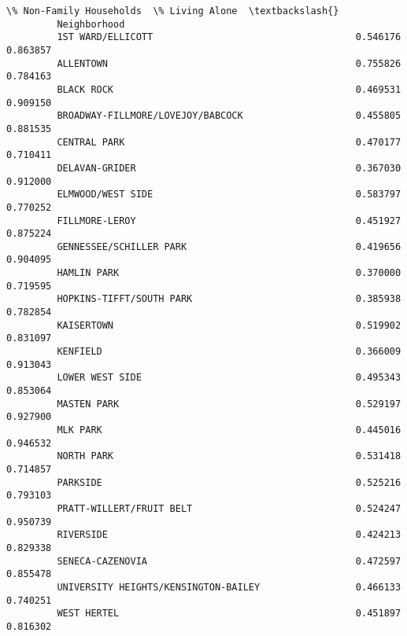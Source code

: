 \documentclass[11pt]{article}
\begin{document}
\begin{Verbatim}[commandchars=\\\{\}]
                                               \% Non-Family Households  \% Living Alone  \textbackslash{}
         Neighborhood                                                                    
         1ST WARD/ELLICOTT                                    0.546176        0.863857   
         ALLENTOWN                                            0.755826        0.784163   
         BLACK ROCK                                           0.469531        0.909150   
         BROADWAY-FILLMORE/LOVEJOY/BABCOCK                    0.455805        0.881535   
         CENTRAL PARK                                         0.470177        0.710411   
         DELAVAN-GRIDER                                       0.367030        0.912000   
         ELMWOOD/WEST SIDE                                    0.583797        0.770252   
         FILLMORE-LEROY                                       0.451927        0.875224   
         GENNESSEE/SCHILLER PARK                              0.419656        0.904095   
         HAMLIN PARK                                          0.370000        0.719595   
         HOPKINS-TIFFT/SOUTH PARK                             0.385938        0.782854   
         KAISERTOWN                                           0.519902        0.831097   
         KENFIELD                                             0.366009        0.913043   
         LOWER WEST SIDE                                      0.495343        0.853064   
         MASTEN PARK                                          0.529197        0.927900   
         MLK PARK                                             0.445016        0.946532   
         NORTH PARK                                           0.531418        0.714857   
         PARKSIDE                                             0.525216        0.793103   
         PRATT-WILLERT/FRUIT BELT                             0.524247        0.950739   
         RIVERSIDE                                            0.424213        0.829338   
         SENECA-CAZENOVIA                                     0.472597        0.855478   
         UNIVERSITY HEIGHTS/KENSINGTON-BAILEY                 0.466133        0.740251   
         WEST HERTEL                                          0.451897        0.816302   
         

\end{Verbatim}
\end{document}

